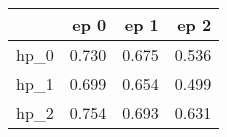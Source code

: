 \begin{tabular}{lrrr}
\toprule
{} &   ep 0 &   ep 1 &   ep 2 \\
\midrule
hp\_0 &  0.730 &  0.675 &  0.536 \\
hp\_1 &  0.699 &  0.654 &  0.499 \\
hp\_2 &  0.754 &  0.693 &  0.631 \\
\bottomrule
\end{tabular}
